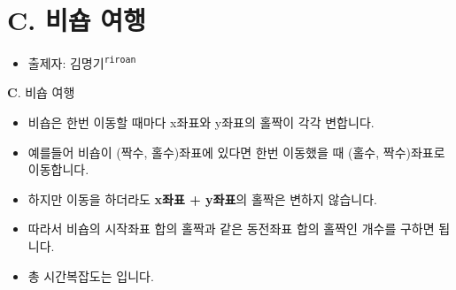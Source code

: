 \section{C. 비숍 여행}

\begin{frame} %
    \begin{itemize}
        \item 출제자: 김명기\textsuperscript{\color{kupc-gray}\texttt{riroan}}
    \end{itemize}
\end{frame}

\begin{frame}{\textbf{C}. 비숍 여행}
    \begin{itemize}
    	\item 비숍은 한번 이동할 때마다 x좌표와 y좌표의 홀짝이 각각 변합니다.
    	\item 예를들어 비숍이 (짝수, 홀수)좌표에 있다면 한번 이동했을 때 (홀수, 짝수)좌표로 이동합니다.
    	\item 하지만 이동을 하더라도 \textbf{x좌표 + y좌표}의 홀짝은 변하지 않습니다.
    	\item 따라서 비숍의 시작좌표 합의 홀짝과 같은 동전좌표 합의 홀짝인 개수를 구하면 됩니다.
    	\item 총 시간복잡도는 입니다.
    \end{itemize}
\end{frame}